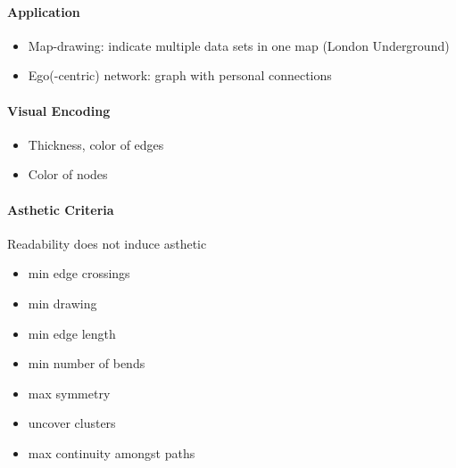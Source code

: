 \documentclass[10pt,a4paper]{article}
\begin{document}
	\paragraph{Application}
	\begin{itemize}
		\item Map-drawing: indicate multiple data sets in one map (London Underground)
		\item Ego(-centric) network: graph with personal connections 
	\end{itemize}
	
	\paragraph{Visual Encoding}
	\begin{itemize}
		\item Thickness, color of edges
		\item Color of nodes
	\end{itemize}
	
	\paragraph{Asthetic Criteria}
	Readability does not induce asthetic
	\begin{itemize}
		\item min edge crossings
		\item min drawing
		\item min edge length
		\item min number of bends
		\item max symmetry
		\item uncover clusters
		\item max continuity amongst paths
	\end{itemize}
	
\end{document}
